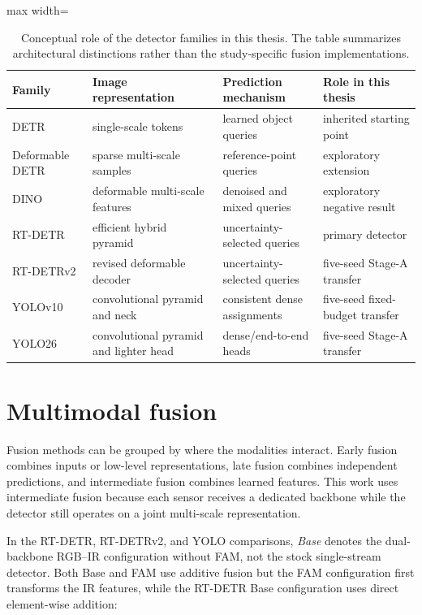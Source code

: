 \begin{table}[htbp]
  \centering
  \caption{Conceptual role of the detector families in this thesis. The table
  summarizes architectural distinctions rather than the study-specific
  fusion implementations.}
  \label{tab:detector-family-comparison}
  \begin{adjustbox}{max width=\textwidth}
  \begin{tabular}{llll}
    \toprule
    Family & Image representation & Prediction mechanism & Role in this thesis \\
    \midrule
    DETR & single-scale tokens & learned object queries & inherited starting point \\
    Deformable DETR & sparse multi-scale samples & reference-point queries & exploratory extension \\
    DINO & deformable multi-scale features & denoised and mixed queries & exploratory negative result \\
    RT-DETR & efficient hybrid pyramid & uncertainty-selected queries & primary detector \\
    RT-DETRv2 & revised deformable decoder & uncertainty-selected queries & five-seed Stage-A transfer \\
    YOLOv10 & convolutional pyramid and neck & consistent dense assignments & five-seed fixed-budget transfer \\
    YOLO26 & convolutional pyramid and lighter head & dense/end-to-end heads & five-seed Stage-A transfer \\
    \bottomrule
  \end{tabular}
  \end{adjustbox}
\end{table}

\section{Multimodal fusion}

Fusion methods can be grouped by where the modalities interact. Early fusion
combines inputs or low-level representations, late fusion combines independent
predictions, and intermediate fusion combines learned features. This work uses
intermediate fusion because each sensor receives a dedicated backbone while
the detector still operates on a joint multi-scale representation.

In the RT-DETR, RT-DETRv2, and YOLO comparisons, \emph{Base} denotes the
dual-backbone RGB--IR configuration without FAM, not the stock single-stream
detector. Both Base and FAM use additive fusion but the FAM configuration first
transforms the IR features, while the RT-DETR Base configuration uses direct
element-wise addition:

